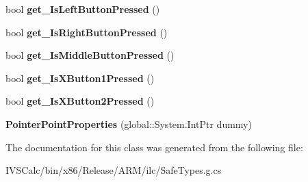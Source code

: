 \begin{DoxyCompactItemize}
\item 
\mbox{\label{class_windows_1_1_u_i_1_1_input_1_1_pointer_point_properties_a23f774c121d3c08433836bb8994e0410}} 
bool {\bfseries get\+\_\+\+Is\+Left\+Button\+Pressed} ()
\item 
\mbox{\label{class_windows_1_1_u_i_1_1_input_1_1_pointer_point_properties_a4c1ece4234a95cbc36c310e36a88c89a}} 
bool {\bfseries get\+\_\+\+Is\+Right\+Button\+Pressed} ()
\item 
\mbox{\label{class_windows_1_1_u_i_1_1_input_1_1_pointer_point_properties_a578940e65954826ff263c54b68044bfc}} 
bool {\bfseries get\+\_\+\+Is\+Middle\+Button\+Pressed} ()
\item 
\mbox{\label{class_windows_1_1_u_i_1_1_input_1_1_pointer_point_properties_acbf0ec5a5c5503b8dd3bd1f4345033ce}} 
bool {\bfseries get\+\_\+\+Is\+X\+Button1\+Pressed} ()
\item 
\mbox{\label{class_windows_1_1_u_i_1_1_input_1_1_pointer_point_properties_a36dfa140aed3e3e2297ad5ed1bb397f8}} 
bool {\bfseries get\+\_\+\+Is\+X\+Button2\+Pressed} ()
\item 
\mbox{\label{class_windows_1_1_u_i_1_1_input_1_1_pointer_point_properties_a28e1b5be049dcdb7469e84eb3820fe8a}} 
{\bfseries Pointer\+Point\+Properties} (global\+::\+System.\+Int\+Ptr dummy)
\end{DoxyCompactItemize}


The documentation for this class was generated from the following file\+:\begin{DoxyCompactItemize}
\item 
I\+V\+S\+Calc/bin/x86/\+Release/\+A\+R\+M/ilc/Safe\+Types.\+g.\+cs\end{DoxyCompactItemize}
